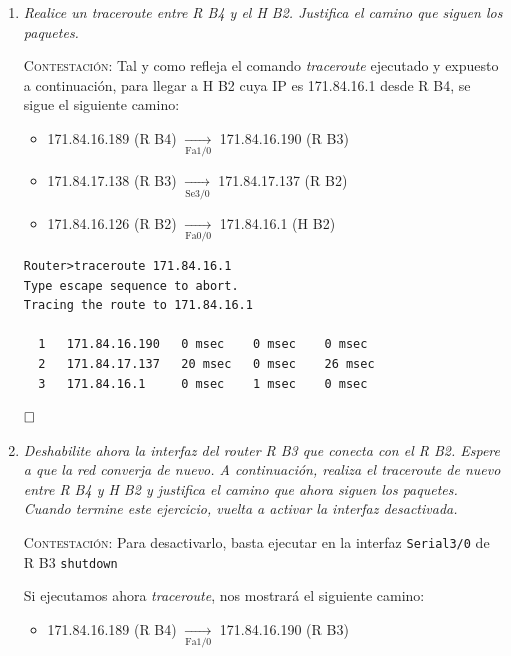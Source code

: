 \documentclass[11pt]{article}
\begin{document}
\begin{enumerate}

    \item \textit{Realice un traceroute entre R B4 y el H B2. Justifica el camino que siguen los paquetes.}

\vspace{7px}

\textsc{Contestación}: Tal y como refleja el comando \textit{traceroute} ejecutado y expuesto a continuación, para llegar a H B2 cuya IP es 171.84.16.1 desde R B4, se sigue el siguiente camino:
\begin{itemize}
    \item 171.84.16.189 (R B4) $\xrightarrow[\text{Fa1/0}]{}$ 171.84.16.190 (R B3)

    \item 171.84.17.138 (R B3) $\xrightarrow[\text{Se3/0}]{}$ 171.84.17.137 (R B2)

    \item 171.84.16.126 (R B2) $\xrightarrow[\text{Fa0/0}]{}$ 171.84.16.1 (H B2)
\end{itemize}

\begin{mdframed}
\begin{verbatim}
Router>traceroute 171.84.16.1
Type escape sequence to abort.
Tracing the route to 171.84.16.1

  1   171.84.16.190   0 msec    0 msec    0 msec    
  2   171.84.17.137   20 msec   0 msec    26 msec   
  3   171.84.16.1     0 msec    1 msec    0 msec    
\end{verbatim}
\end{mdframed}

$\hfill\square$

\vspace{12px}

    \item \textit{Deshabilite ahora la interfaz del router R B3 que conecta con el R B2. Espere a que la red converja de nuevo. A continuación, realiza el traceroute de nuevo entre R B4 y H B2 y justifica el camino que ahora siguen los paquetes. Cuando termine este ejercicio, vuelta a activar la interfaz desactivada.}

\vspace{7px}

\textsc{Contestación}: 
Para desactivarlo, basta ejecutar en la interfaz \texttt{Serial3/0} de R B3 \texttt{shutdown}

Si ejecutamos ahora \textit{traceroute}, nos mostrará el siguiente camino:
\begin{itemize}
    \item 171.84.16.189 (R B4) $\xrightarrow[\text{Fa1/0}]{}$ 171.84.16.190 (R B3)


\end{itemize}
\end{enumerate}
\end{document}
